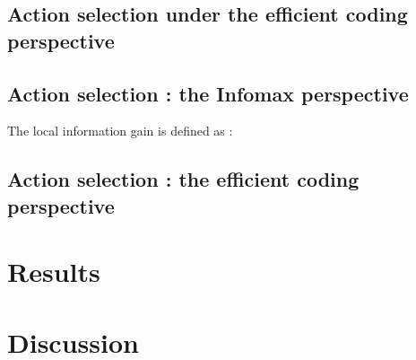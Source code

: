 \documentclass[12pt,twoside,openright]{article}
\begin{document}
\subsection{Action selection under the efficient coding perspective}


\subsection{Action selection : the Infomax perspective}

The local information gain is defined as :


\subsection{Action selection : the efficient coding perspective}

\section{Results}

\section{Discussion}



\end{document}

